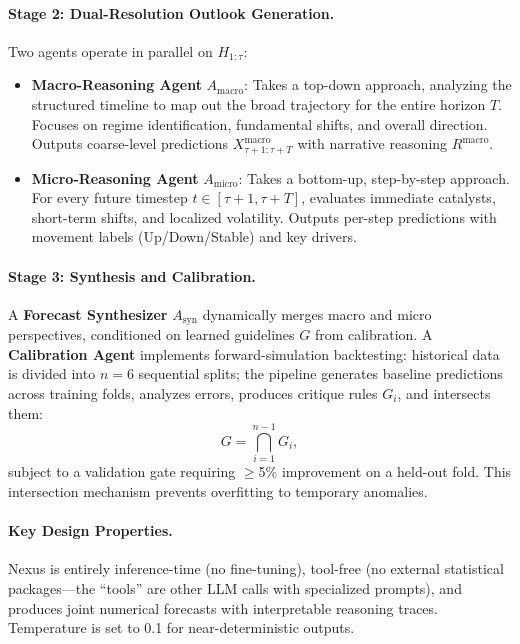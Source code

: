 \documentclass[11pt,a4paper]{article}
\begin{document}
\paragraph{Stage 2: Dual-Resolution Outlook Generation.}
Two agents operate in parallel on $H_{1:\tau}$:
\begin{itemize}[nosep]
\item \textbf{Macro-Reasoning Agent} $A_{\mathrm{macro}}$: Takes a top-down approach, analyzing the structured timeline to map out the broad trajectory for the entire horizon $T$. Focuses on regime identification, fundamental shifts, and overall direction. Outputs coarse-level predictions $X^{\mathrm{macro}}_{\tau+1:\tau+T}$ with narrative reasoning $R^{\mathrm{macro}}$.
\item \textbf{Micro-Reasoning Agent} $A_{\mathrm{micro}}$: Takes a bottom-up, step-by-step approach. For every future timestep $t \in [\tau{+}1, \tau{+}T]$, evaluates immediate catalysts, short-term shifts, and localized volatility. Outputs per-step predictions with movement labels (Up/Down/Stable) and key drivers.
\end{itemize}

\paragraph{Stage 3: Synthesis and Calibration.}
A \textbf{Forecast Synthesizer} $A_{\mathrm{syn}}$ dynamically merges macro and micro perspectives, conditioned on learned guidelines $G$ from calibration. A \textbf{Calibration Agent} implements forward-simulation backtesting: historical data is divided into $n{=}6$ sequential splits; the pipeline generates baseline predictions across training folds, analyzes errors, produces critique rules $G_i$, and intersects them:
\begin{equation}
G = \bigcap_{i=1}^{n-1} G_i,
\end{equation}
subject to a validation gate requiring $\geq$5\% improvement on a held-out fold. This intersection mechanism prevents overfitting to temporary anomalies.

\paragraph{Key Design Properties.} Nexus is entirely inference-time (no fine-tuning), tool-free (no external statistical packages---the ``tools'' are other LLM calls with specialized prompts), and produces joint numerical forecasts with interpretable reasoning traces. Temperature is set to 0.1 for near-deterministic outputs.
\end{document}
